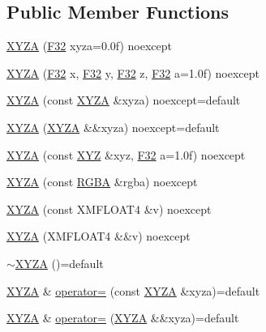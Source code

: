 \subsection*{Public Member Functions}
\begin{DoxyCompactItemize}
\item 
\hyperlink{structmage_1_1_x_y_z_a_af2ffae1531c19dc3db28c8b778aa1bf9}{X\+Y\+ZA} (\hyperlink{namespacemage_aa97e833b45f06d60a0a9c4fc22ae02c0}{F32} xyza=0.\+0f) noexcept
\item 
\hyperlink{structmage_1_1_x_y_z_a_a580f9d9583741a67a8285460e7ddb5e3}{X\+Y\+ZA} (\hyperlink{namespacemage_aa97e833b45f06d60a0a9c4fc22ae02c0}{F32} x, \hyperlink{namespacemage_aa97e833b45f06d60a0a9c4fc22ae02c0}{F32} y, \hyperlink{namespacemage_aa97e833b45f06d60a0a9c4fc22ae02c0}{F32} z, \hyperlink{namespacemage_aa97e833b45f06d60a0a9c4fc22ae02c0}{F32} a=1.\+0f) noexcept
\item 
\hyperlink{structmage_1_1_x_y_z_a_a82a473049888629be36928d15f19ad8b}{X\+Y\+ZA} (const \hyperlink{structmage_1_1_x_y_z_a}{X\+Y\+ZA} \&xyza) noexcept=default
\item 
\hyperlink{structmage_1_1_x_y_z_a_a85343d57a853b9fe8dad686be291bb70}{X\+Y\+ZA} (\hyperlink{structmage_1_1_x_y_z_a}{X\+Y\+ZA} \&\&xyza) noexcept=default
\item 
\hyperlink{structmage_1_1_x_y_z_a_a11e46fc8b87bc6120b49a5d8824213fb}{X\+Y\+ZA} (const \hyperlink{structmage_1_1_x_y_z}{X\+YZ} \&xyz, \hyperlink{namespacemage_aa97e833b45f06d60a0a9c4fc22ae02c0}{F32} a=1.\+0f) noexcept
\item 
\hyperlink{structmage_1_1_x_y_z_a_a8571290c4ba9eaf9d33da17f30b8ac0f}{X\+Y\+ZA} (const \hyperlink{structmage_1_1_r_g_b_a}{R\+G\+BA} \&rgba) noexcept
\item 
\hyperlink{structmage_1_1_x_y_z_a_a2e45699cb48b6ec3e5fa5ca0c761dbab}{X\+Y\+ZA} (const X\+M\+F\+L\+O\+A\+T4 \&v) noexcept
\item 
\hyperlink{structmage_1_1_x_y_z_a_a184e14af2451cc53788ceabdcf8f1a39}{X\+Y\+ZA} (X\+M\+F\+L\+O\+A\+T4 \&\&v) noexcept
\item 
\hyperlink{structmage_1_1_x_y_z_a_a2f706527b01ff7e86099b76180ebd25f}{$\sim$\+X\+Y\+ZA} ()=default
\item 
\hyperlink{structmage_1_1_x_y_z_a}{X\+Y\+ZA} \& \hyperlink{structmage_1_1_x_y_z_a_a14c9712450879f4c754f2a78f11c944c}{operator=} (const \hyperlink{structmage_1_1_x_y_z_a}{X\+Y\+ZA} \&xyza)=default
\item 
\hyperlink{structmage_1_1_x_y_z_a}{X\+Y\+ZA} \& \hyperlink{structmage_1_1_x_y_z_a_aad510a85c47f8023a56717778f6e2904}{operator=} (\hyperlink{structmage_1_1_x_y_z_a}{X\+Y\+ZA} \&\&xyza)=default
\end{DoxyCompactItemize}


